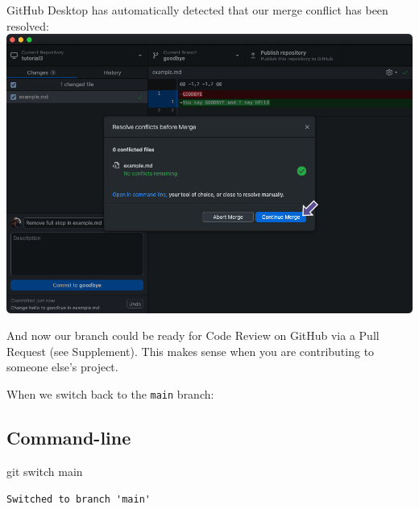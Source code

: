 \documentclass[
  letterpaper,
  DIV=11,
  numbers=noendperiod]{scrartcl}
\newenvironment{Shaded}{\begin{snugshade}}{\end{snugshade}}
\newcommand{\FunctionTok}[1]{\textcolor[rgb]{0.28,0.35,0.67}{#1}}
\newcommand{\NormalTok}[1]{\textcolor[rgb]{0.00,0.23,0.31}{#1}}
\begin{document}
GitHub Desktop has automatically detected that our merge conflict has
been resolved: \includegraphics{images/image68.png}

\begin{tcolorbox}[enhanced jigsaw, opacitybacktitle=0.6, arc=.35mm, toprule=.15mm, leftrule=.75mm, colbacktitle=quarto-callout-note-color!10!white, bottomrule=.15mm, rightrule=.15mm, opacityback=0, title=\textcolor{quarto-callout-note-color}{\faInfo}\hspace{0.5em}{Note}, toptitle=1mm, breakable, left=2mm, colback=white, titlerule=0mm, bottomtitle=1mm, coltitle=black, colframe=quarto-callout-note-color-frame]

And now our branch could be ready for Code Review on GitHub via a Pull
Request (see Supplement). This makes sense when you are contributing to
someone else's project.

\end{tcolorbox}

When we switch back to the \texttt{main} branch:

\subsection{Command-line}

\begin{Shaded}
\begin{Highlighting}[]
\FunctionTok{git}\NormalTok{ switch main}
\end{Highlighting}
\end{Shaded}

\begin{verbatim}
Switched to branch 'main'
\end{verbatim}
\end{document}
